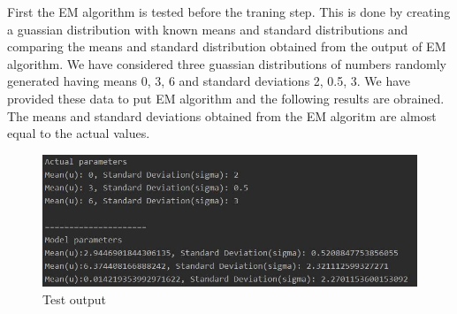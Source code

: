 \documentclass[12pt]{article}
\begin{document}
First the EM algorithm is tested before the traning step. This is done by creating a guassian distribution with known means and standard distributions and comparing the means and standard distribution obtained from the output of EM algorithm.
\newline
We have considered three guassian distributions of numbers randomly generated having means 0, 3, 6 and standard deviations 2, 0.5, 3. We have provided these data to put EM  algorithm and the following results are obrained. The means and standard deviations obtained from the EM algoritm are almost equal to the actual values.
\newline
 \begin{figure}[h]
    \centering
    \includegraphics[width=13cm]{testoutput}
    \caption{Test output}
    \label{fig:Test output}
\end{figure}
\end{document}
